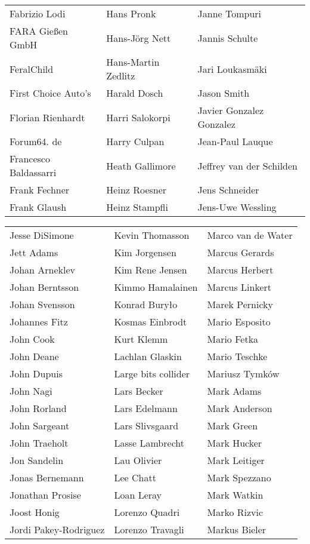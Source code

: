 \begin{small}
\begin{tabular}{p{4cm}p{4cm}p{4cm}}
Fabrizio Lodi & Hans Pronk & Janne Tompuri \\
FARA Gießen GmbH & Hans-Jörg Nett & Jannis Schulte \\
FeralChild & Hans-Martin Zedlitz & Jari Loukasmäki \\
First Choice Auto's & Harald Dosch & Jason Smith \\
Florian Rienhardt & Harri Salokorpi & Javier Gonzalez Gonzalez \\
Forum64. de & Harry Culpan & Jean-Paul Lauque \\
Francesco Baldassarri & Heath Gallimore & Jeffrey van der Schilden \\
Frank Fechner & Heinz Roesner & Jens Schneider \\
Frank Glaush & Heinz Stampfli & Jens-Uwe Wessling \\
\end{tabular}
\newpage
\setlength{\tabcolsep}{1mm}
\begin{tabular}{p{4cm}p{4cm}p{4cm}}
Jesse DiSimone & Kevin Thomasson & Marco van de Water \\
Jett Adams & Kim Jorgensen & Marcus Gerards \\
Johan Arneklev & Kim Rene Jensen & Marcus Herbert \\
Johan Berntsson & Kimmo Hamalainen & Marcus Linkert \\
Johan Svensson & Konrad Buryło & Marek Pernicky \\
Johannes Fitz & Kosmas Einbrodt & Mario Esposito \\
John Cook & Kurt Klemm & Mario Fetka \\
John Deane & Lachlan Glaskin & Mario Teschke \\
John Dupuis & Large bits collider & Mariusz Tymków \\
John Nagi & Lars Becker & Mark Adams \\
John Rorland & Lars Edelmann & Mark Anderson \\
John Sargeant & Lars Slivsgaard & Mark Green \\
John Traeholt & Lasse Lambrecht & Mark Hucker \\
Jon Sandelin & Lau Olivier & Mark Leitiger \\
Jonas Bernemann & Lee Chatt & Mark Spezzano \\
Jonathan Prosise & Loan Leray & Mark Watkin \\
Joost Honig & Lorenzo Quadri & Marko Rizvic \\
Jordi Pakey-Rodriguez & Lorenzo Travagli & Markus Bieler \\

\end{tabular}
\end{small}
